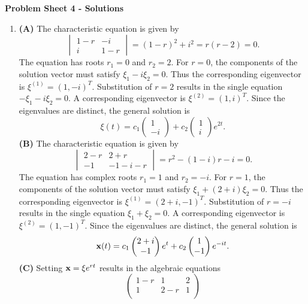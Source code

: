 \documentclass[11pt,a4paper]{article}
\begin{document}
	\begin{center}
		\textbf{Problem Sheet 4 - Solutions}
	\end{center}
	\begin{enumerate}
		\item \textbf{(A)} The characteristic equation is given by
		$$
		\begin{vmatrix}
			1-r & -i\\
			i & 1-r
		\end{vmatrix} = (1-r)^2 + i^2 = r(r - 2) = 0.
		$$
		The equation has roots $r_1 = 0$ and $r_2 = 2$. For $r = 0$, the components of the solution vector must satisfy $\xi_1 − i\xi_2 = 0$. Thus the corresponding eigenvector is $\xi^{(1)} = (1, -i)^T$. Substitution of $r = 2$ results in the single equation $-\xi_1 - i\xi_2 = 0$. A corresponding eigenvector is $\xi^{(2)} = (1, i)^T$. Since the eigenvalues are distinct, the general solution is
		$$
		\xi(t) = c_1
		\begin{pmatrix}
			1\\
			-i
		\end{pmatrix} + c_2
		\begin{pmatrix}
			1\\
			i
		\end{pmatrix}e^{2t}.
		$$
		\textbf{(B)} The characteristic equation is given by
		$$
		\begin{vmatrix}
			2-r & 2+r\\
			-1 & -1-i-r
		\end{vmatrix} = r^2 -(1-i)r-i=0.
		$$
		The equation has complex roots $r_1 = 1$ and $r_2 = -i$. For $r = 1$, the components of the solution vector must satisfy $\xi_1 + (2 + i)\xi_2 = 0$. Thus the corresponding eigenvector is $\xi^{(1)} = (2 + i, −1)^T$. Substitution of $r = -i$ results in the single equation $\xi_1 + \xi_2 = 0$. A corresponding eigenvector is $\xi^{(2)} = (1, −1)^T$. Since the eigenvalues are distinct, the general solution is
		$$
		\vb{x}(t) = c_1
		\begin{pmatrix}
			2+i\\
			-1
		\end{pmatrix}e^t + c_2
		\begin{pmatrix}
			1\\
			-1
		\end{pmatrix}e^{-it}.
		$$
		\textbf{(C)} Setting $\vb{x} = \xi e^{rt}$ results in the algebraic equations
		$$
		\begin{pmatrix}
			1-r & 1 & 2\\
			1 & 2-r & 1\\

\end{pmatrix}$$
\end{enumerate}
\end{document}

